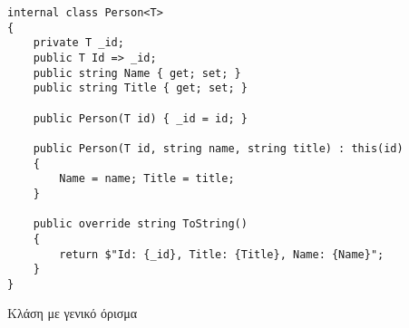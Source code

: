 \begin{listing}[htbp]
\begin{verbatim}
internal class Person<T>
{
    private T _id;
    public T Id => _id;
    public string Name { get; set; }
    public string Title { get; set; }

    public Person(T id) { _id = id; }
    
    public Person(T id, string name, string title) : this(id)
    {
        Name = name; Title = title;
    }

    public override string ToString()
    {
        return $"Id: {_id}, Title: {Title}, Name: {Name}";
    }
}
\end{verbatim}
\caption{Κλάση με γενικό όρισμα}
\label{genericsPersonClass}
\end{listing}
